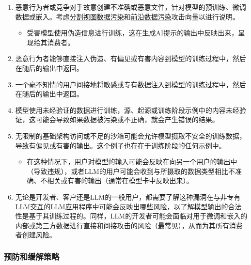 \documentclass[
]{article}
\providecommand{\tightlist}{%
  \setlength{\itemsep}{0pt}\setlength{\parskip}{0pt}}
\begin{document}
\begin{enumerate}
\def\labelenumi{\arabic{enumi}.}
\tightlist
\item
  恶意行为者或竞争对手故意创建不准确或恶意文件，针对模型的预训练、微调数据或嵌入。考虑\href{https://github.com/GangGreenTemperTatum/speaking/blob/main/dc604/hacker-summer-camp-23/Ads\%20_\%20Poisoning\%20Web\%20Training\%20Datasets\%20_\%20Flow\%20Diagram\%20-\%20Exploit\%201\%20Split-View\%20Data\%20Poisoning.jpeg}{分割视图数据污染}和\href{https://github.com/GangGreenTemperTatum/speaking/blob/main/dc604/hacker-summer-camp-23/Ads\%20_\%20Poisoning\%20Web\%20Training\%20Datasets\%20_\%20Flow\%20Diagram\%20-\%20Exploit\%202\%20Frontrunning\%20Data\%20Poisoning.jpeg}{前沿数据污染}攻击向量以进行说明。

  \begin{itemize}
  \tightlist
  \item
    受害模型使用伪造信息进行训练，这在生成AI提示的输出中反映出来，呈现给其消费者。
  \end{itemize}
\item
  恶意行为者能够直接注入伪造、有偏见或有害内容到模型的训练过程中，然后在随后的输出中返回。
\item
  一个毫不知情的用户间接地将敏感或专有数据注入到模型的训练过程中，然后在随后的输出中返回。
\item
  模型使用未经验证的数据进行训练，源、起源或训练阶段示例中的内容未经验证，这可能会导致如果数据被污染或不正确，就会产生错误的结果。
\item
  无限制的基础架构访问或不足的沙箱可能会允许模型摄取不安全的训练数据，导致有偏见或有害的输出。这个例子也存在于训练阶段的任何示例中。

  \begin{itemize}
  \tightlist
  \item
    在这种情况下，用户对模型的输入可能会反映在向另一个用户的输出中（导致违规），或者LLM的用户可能会收到与所摄取的数据类型相比不准确、不相关或有害的输出（通常在模型卡中反映出来）。
  \end{itemize}
\item
  无论是开发者、客户还是LLM的一般用户，都需要了解这种漏洞在与非专有LLM交互的LLM应用程序中可能会反映出哪些风险，以了解模型输出的合法性是基于其训练过程的。同样，LLM的开发者可能会面临对用于微调和嵌入的内部或第三方数据进行直接和间接攻击的风险（最常见），从而为其所有消费者创建风险。
\end{enumerate}

\subsubsection{预防和缓解策略}\label{ux9884ux9632ux548cux7f13ux89e3ux7b56ux7565}
\end{document}
